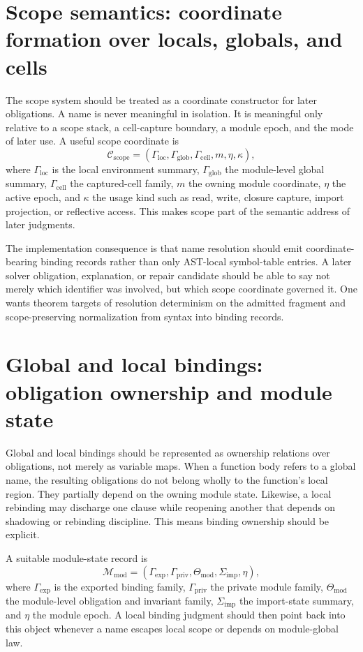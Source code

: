 \documentclass[11pt]{report}
\begin{document}
\section{Scope semantics: coordinate formation over locals, globals, and cells}
The scope system should be treated as a coordinate constructor for later obligations. A name is never meaningful in isolation. It is meaningful only relative to a scope stack, a cell-capture boundary, a module epoch, and the mode of later use. A useful scope coordinate is
\[
\mathcal{C}_{\mathrm{scope}} = (\Gamma_{\mathrm{loc}}, \Gamma_{\mathrm{glob}}, \Gamma_{\mathrm{cell}}, m, \eta, \kappa),
\]
where $\Gamma_{\mathrm{loc}}$ is the local environment summary, $\Gamma_{\mathrm{glob}}$ the module-level global summary, $\Gamma_{\mathrm{cell}}$ the captured-cell family, $m$ the owning module coordinate, $\eta$ the active epoch, and $\kappa$ the usage kind such as read, write, closure capture, import projection, or reflective access. This makes scope part of the semantic address of later judgments.

The implementation consequence is that name resolution should emit coordinate-bearing binding records rather than only AST-local symbol-table entries. A later solver obligation, explanation, or repair candidate should be able to say not merely which identifier was involved, but which scope coordinate governed it. One wants theorem targets of resolution determinism on the admitted fragment and scope-preserving normalization from syntax into binding records.
\section{Global and local bindings: obligation ownership and module state}
Global and local bindings should be represented as ownership relations over obligations, not merely as variable maps. When a function body refers to a global name, the resulting obligations do not belong wholly to the function's local region. They partially depend on the owning module state. Likewise, a local rebinding may discharge one clause while reopening another that depends on shadowing or rebinding discipline. This means binding ownership should be explicit.

A suitable module-state record is
\[
\mathcal{M}_{\mathrm{mod}} = (\Gamma_{\mathrm{exp}}, \Gamma_{\mathrm{priv}}, \Theta_{\mathrm{mod}}, \Sigma_{\mathrm{imp}}, \eta),
\]
where $\Gamma_{\mathrm{exp}}$ is the exported binding family, $\Gamma_{\mathrm{priv}}$ the private module family, $\Theta_{\mathrm{mod}}$ the module-level obligation and invariant family, $\Sigma_{\mathrm{imp}}$ the import-state summary, and $\eta$ the module epoch. A local binding judgment should then point back into this object whenever a name escapes local scope or depends on module-global law.
\end{document}
